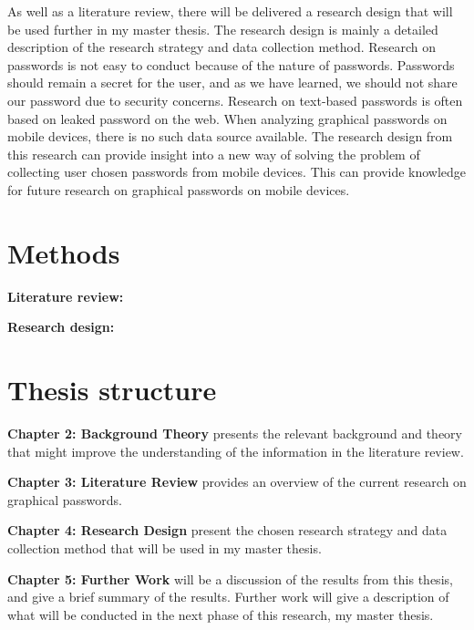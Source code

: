    As well as a literature review, there will be delivered a research design that will be used further in my master thesis. The research design is mainly a detailed description of the research strategy and data collection method. Research on passwords is not easy to conduct because of the nature of passwords. Passwords should remain a secret for the user, and as we have learned, we should not share our password due to security concerns. Research on text-based passwords is often based on leaked password on the web. When analyzing graphical passwords on mobile devices, there is no such data source available. 
    The research design from this research can provide insight into a new way of solving the problem of collecting user chosen passwords from mobile devices. This can provide knowledge for future research on graphical passwords on mobile devices.

  \section{Methods}

    {\bf Literature review:}

    {\bf Research design:}

  \section{Thesis structure}

    {\bf Chapter 2: Background Theory} presents the relevant background and theory that might improve the understanding of the information in the literature review. 

    {\bf Chapter 3: Literature Review} provides an overview of the current research on graphical passwords. 

    {\bf Chapter 4: Research Design} present the chosen research strategy and data collection method that will be used in my master thesis. 

    {\bf Chapter 5: Further Work} will be a discussion of the results from this thesis, and give a brief summary of the results. Further work will give a description of what will be conducted in the next phase of this research, my master thesis.  





